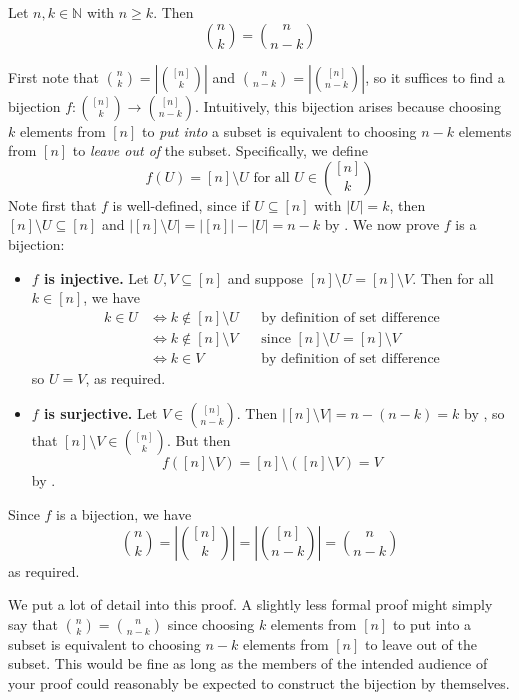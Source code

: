 \begin{proposition}
Let $n,k \in \mathbb{N}$ with $n \ge k$. Then \[ \binom{n}{k} = \binom{n}{n-k} \]
\end{proposition}
\begin{cproof}
First note that $\binom{n}{k} = \left| \binom{[n]}{k} \right|$ and $\binom{n}{n-k} = \left| \binom{[n]}{n-k} \right|$, so it suffices to find a bijection $f : \binom{[n]}{k} \to \binom{[n]}{n-k}$. Intuitively, this bijection arises because choosing $k$ elements from $[n]$ to \textit{put into} a subset is equivalent to choosing $n-k$ elements from $[n]$ to \textit{leave out of} the subset. Specifically, we define
\[ f(U) = [n] \setminus U \text{ for all } U \in \binom{[n]}{k} \]
Note first that $f$ is well-defined, since if $U \subseteq [n]$ with $|U|=k$, then $[n] \setminus U \subseteq [n]$ and $|[n] \setminus U| = |[n]|-|U| = n-k$ by . We now prove $f$ is a bijection:
\begin{itemize}
\item \textbf{$f$ is injective.} Let $U, V \subseteq [n]$ and suppose $[n] \setminus U = [n] \setminus V$. Then for all $k \in [n]$, we have
\begin{align*}
k \in U &\Leftrightarrow k \not \in [n] \setminus U && \text{by definition of set difference} \\
&\Leftrightarrow k \not \in [n] \setminus V && \text{since $[n] \setminus U = [n] \setminus V$} \\
&\Leftrightarrow k \in V && \text{by definition of set difference}
\end{align*}
so $U=V$, as required.
\item \textbf{$f$ is surjective.} Let $V \in \binom{[n]}{n-k}$. Then $|[n] \setminus V| = n-(n-k) = k$ by , so that $[n] \setminus V \in \binom{[n]}{k}$. But then
\[ f([n] \setminus V) = [n] \setminus ([n] \setminus V) = V \]
by .
\end{itemize}
Since $f$ is a bijection, we have
\[ \binom{n}{k} = \left| \binom{[n]}{k} \right| = \left| \binom{[n]}{n-k} \right| = \binom{n}{n-k} \]
as required.
\end{cproof}

We put a lot of detail into this proof. A slightly less formal proof might simply say that $\binom{n}{k} = \binom{n}{n-k}$ since choosing $k$ elements from $[n]$ to put into a subset is equivalent to choosing $n-k$ elements from $[n]$ to leave out of the subset. This would be fine as long as the members of the intended audience of your proof could reasonably be expected to construct the bijection by themselves.

